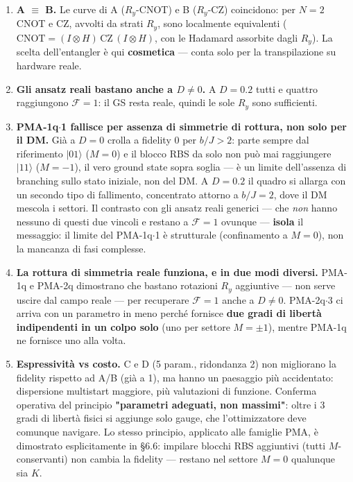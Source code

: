 \documentclass[11pt,a4paper]{article}
\begin{document}
\begin{enumerate}[leftmargin=1.4em,itemsep=0.4em]
\item \textbf{A $\equiv$ B.} Le curve di A ($R_y$-CNOT) e B ($R_y$-CZ)
coincidono: per $N=2$ CNOT e CZ, avvolti da strati $R_y$, sono
localmente equivalenti
($\mathrm{CNOT}=(I\otimes H)\,\mathrm{CZ}\,(I\otimes H)$, con le
Hadamard assorbite dagli $R_y$). La scelta dell'entangler è qui
\textbf{cosmetica} --- conta solo per la transpilazione su hardware
reale.

\item \textbf{Gli ansatz reali bastano anche a $D\neq0$.} A $D=0.2$
tutti e quattro raggiungono $\mathcal F=1$: il GS resta reale, quindi
le sole $R_y$ sono sufficienti.

\item \textbf{PMA-1q$\cdot$1 fallisce per assenza di simmetrie di
rottura, non solo per il DM.} Già a $D=0$ crolla a fidelity $0$ per
$b/J>2$: parte sempre dal riferimento $|01\rangle$ ($M=0$) e il blocco
RBS da solo non può mai raggiungere $|11\rangle$ ($M=-1$), il vero
ground state sopra soglia --- è un limite dell'assenza di branching
sullo stato iniziale, non del DM. A $D=0.2$ il quadro si allarga con un
secondo tipo di fallimento, concentrato attorno a $b/J=2$, dove il DM
mescola i settori. Il contrasto con gli ansatz reali generici --- che
\emph{non} hanno nessuno di questi due vincoli e restano a
$\mathcal F=1$ ovunque --- \textbf{isola} il messaggio: il limite del
PMA-1q$\cdot$1 è strutturale (confinamento a $M=0$), non la mancanza di
fasi complesse.

\item \textbf{La rottura di simmetria reale funziona, e in due modi
diversi.} PMA-1q e PMA-2q dimostrano che bastano rotazioni $R_y$
aggiuntive --- non serve uscire dal campo reale --- per recuperare
$\mathcal F=1$ anche a $D\neq0$. PMA-2q$\cdot$3 ci arriva con un
parametro in meno perché fornisce \textbf{due gradi di libertà
indipendenti in un colpo solo} (uno per settore $M=\pm1$), mentre
PMA-1q ne fornisce uno alla volta.

\item \textbf{Espressività vs costo.} C e D (5 param., ridondanza 2)
non migliorano la fidelity rispetto ad A/B (già a 1), ma hanno un
paesaggio più accidentato: dispersione multistart maggiore, più
valutazioni di funzione. Conferma operativa del principio
\textbf{"parametri adeguati, non massimi"}: oltre i 3 gradi di libertà
fisici si aggiunge solo gauge, che l'ottimizzatore deve comunque
navigare. Lo stesso principio, applicato alle famiglie PMA, è
dimostrato esplicitamente in \S 6.6: impilare blocchi RBS aggiuntivi
(tutti $M$-conservanti) non cambia la fidelity --- restano nel settore
$M=0$ qualunque sia $K$.
\end{enumerate}
\end{document}
